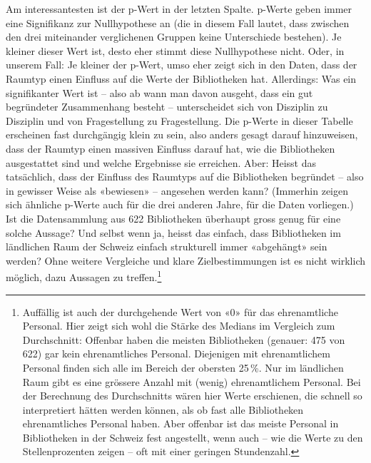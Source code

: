 \documentclass[a4paper,
fontsize=11pt,
oneside,
numbers=noperiodatend,
parskip=half-,
bibliography=totoc,
final
]{scrartcl}
\begin{document}
Am interessantesten ist der p-Wert in der letzten Spalte. p-Werte geben
immer eine Signifikanz zur Nullhypothese an (die in diesem Fall lautet,
dass zwischen den drei miteinander verglichenen Gruppen keine
Unterschiede bestehen). Je kleiner dieser Wert ist, desto eher stimmt
diese Nullhypothese nicht. Oder, in unserem Fall: Je kleiner der p-Wert,
umso eher zeigt sich in den Daten, dass der Raumtyp einen Einfluss auf
die Werte der Bibliotheken hat. Allerdings: Was ein signifikanter Wert
ist -- also ab wann man davon ausgeht, dass ein gut begründeter
Zusammenhang besteht -- unterscheidet sich von Disziplin zu Disziplin
und von Fragestellung zu Fragestellung. Die p-Werte in dieser Tabelle
erscheinen fast durchgängig klein zu sein, also anders gesagt darauf
hinzuweisen, dass der Raumtyp einen massiven Einfluss darauf hat, wie
die Bibliotheken ausgestattet sind und welche Ergebnisse sie erreichen.
Aber: Heisst das tatsächlich, dass der Einfluss des Raumtyps auf die
Bibliotheken begründet -- also in gewisser Weise als «bewiesen» --
angesehen werden kann? (Immerhin zeigen sich ähnliche p-Werte auch für
die drei anderen Jahre, für die Daten vorliegen.) Ist die Datensammlung
aus 622 Bibliotheken überhaupt gross genug für eine solche Aussage? Und
selbst wenn ja, heisst das einfach, dass Bibliotheken im ländlichen Raum
der Schweiz einfach strukturell immer «abgehängt» sein werden? Ohne
weitere Vergleiche und klare Zielbestimmungen ist es nicht wirklich
möglich, dazu Aussagen zu treffen.\footnote{Auffällig ist auch der
  durchgehende Wert von «0» für das ehrenamtliche Personal. Hier zeigt
  sich wohl die Stärke des Medians im Vergleich zum Durchschnitt:
  Offenbar haben die meisten Bibliotheken (genauer: 475 von 622) gar
  kein ehrenamtliches Personal. Diejenigen mit ehrenamtlichem Personal
  finden sich alle im Bereich der obersten 25\,\%. Nur im ländlichen
  Raum gibt es eine grössere Anzahl mit (wenig) ehrenamtlichem Personal.
  Bei der Berechnung des Durchschnitts wären hier Werte erschienen, die
  schnell so interpretiert hätten werden können, als ob fast alle
  Bibliotheken ehrenamtliches Personal haben. Aber offenbar ist das
  meiste Personal in Bibliotheken in der Schweiz fest angestellt, wenn
  auch -- wie die Werte zu den Stellenprozenten zeigen -- oft mit einer
  geringen Stundenzahl.}
\end{document}
